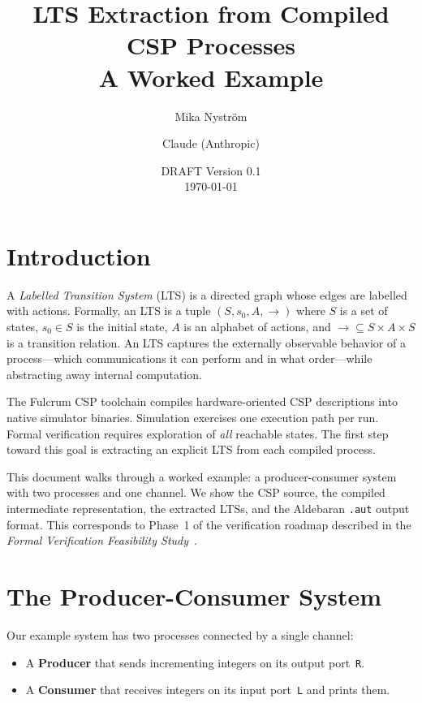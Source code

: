 \documentclass[11pt]{article}
\title{\textbf{LTS Extraction from Compiled CSP Processes} \\[0.5em]
\large A Worked Example}
\author{Mika Nystr\"om \and Claude (Anthropic)}
\date{DRAFT Version 0.1\\
\today}
\begin{document}
\maketitle

\tableofcontents
\newpage

\section{Introduction}

A \emph{Labelled Transition System} (LTS) is a directed graph whose
edges are labelled with actions.  Formally, an LTS is a tuple
$(S, s_0, A, {\to})$ where $S$ is a set of states, $s_0 \in S$ is the
initial state, $A$ is an alphabet of actions, and
${\to} \subseteq S \times A \times S$ is a transition relation.
An LTS captures the externally observable behavior of a
process---which communications it can perform and in what order---while
abstracting away internal computation.

The Fulcrum CSP toolchain compiles hardware-oriented CSP descriptions
into native simulator binaries.  Simulation exercises one execution
path per run.  Formal verification requires exploration of
\emph{all} reachable states.  The first step toward this goal is
extracting an explicit LTS from each compiled process.

This document walks through a worked example: a
producer-consumer system with two processes and one channel.  We show
the CSP source, the compiled intermediate representation, the
extracted LTSs, and the Aldebaran \texttt{.aut} output format.  This
corresponds to Phase~1 of the verification roadmap described in the
\emph{Formal Verification Feasibility Study}~\cite{feasibility}.

\section{The Producer-Consumer System}

Our example system has two processes connected by a single channel:

\begin{itemize}
\item A \textbf{Producer} that sends incrementing integers on its
  output port~\texttt{R}.
\item A \textbf{Consumer} that receives integers on its input
  port~\texttt{L} and prints them.
\end{itemize}
\end{document}
